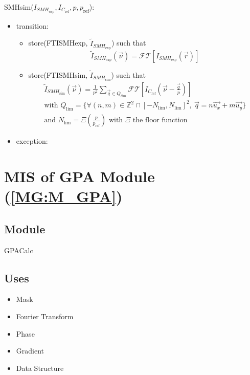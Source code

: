 \documentclass[12pt, titlepage]{article}
\begin{document}
\noindent SMHsim($I_{\mathit{SMH}_{\text{exp}}},I_{C_{\text{ref}}}, p, p_{\text{ref}}$):
\begin{itemize} 
\item transition:
\begin{itemize}
	\item store(FTISMHexp, $\widetilde{I}_{\mathit{SMH}_{\text{exp}}}$) such that
	\begin{equation*}
	\widetilde{I}_{\mathit{SMH}_{\text{exp}}}(\vec{\nu})=\mathcal{FT}[I_{\mathit{SMH}_{\text{exp}}}(\vec{r})]
	\end{equation*}
	\item store(FTISMHsim, $\widetilde{I}_{\mathit{SMH}_{\text{sim}}}$) such that
	\begin{equation*}
	\begin{gathered}
	\widetilde{I}_{\mathit{SMH}_{\text{sim}}}(\vec{\nu})=\frac{1}{p^2}\sum_{\vec{q}\in Q_{lim}}\mathcal{FT}[I_{C_{\text{ref}}}(\vec{\nu}-\frac{\vec{q}}{p})] \\
	\text{with } Q_{\text{lim}}=\{\forall (n,m) \in \mathbb{Z}^{2}\cap[-N_{\text{lim}},N_{\text{lim}}]^2, \ \vec{q}=n\vec{u_x}+m\vec{u_y}\} \\
	\text{and } N_{\text{lim}}=\Xi(\frac{p}{p_{\text{ref}}}) \text{ with } \Xi \text{ the floor function } 
	\end{gathered}
	\end{equation*}
	\end{itemize}

\item exception:
\end{itemize}

\section{MIS of GPA Module (\texorpdfstring{\cref{MG:M_GPA}}))} \label{MIS_GPA}

\subsection{Module}
GPACalc
\subsection{Uses}
\begin{itemize}
\item Mask
\item Fourier Transform
\item Phase
\item Gradient
\item Data Structure
\end{itemize}
\end{document}
